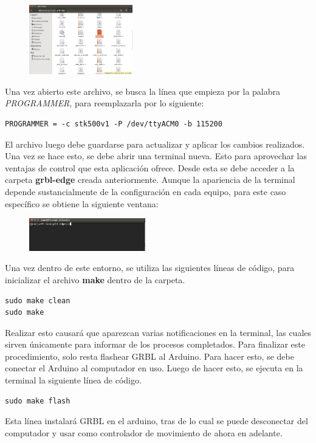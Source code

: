 \documentclass{article}
\begin{document}
\begin{multicols}{2}
\begin{enumerate}
\begin{figure}[H]
\centering
\includegraphics[width=0.4\textwidth]{Carpeta.png}
\label{fig:Carpeta}
\end{figure}

Una vez abierto este archivo, se busca la línea que empieza por la palabra \textit{PROGRAMMER}, para reemplazarla por lo siguiente:
\begin{lstlisting}
PROGRAMMER = -c stk500v1 -P /dev/ttyACM0 -b 115200 
\end{lstlisting}
El archivo luego debe guardarse para actualizar y aplicar los cambios realizados. Una vez se hace esto, se debe abrir una terminal nueva. Esto para aprovechar las ventajas de control que esta aplicación ofrece. Desde esta se debe acceder a la carpeta \textbf{grbl-edge} creada anteriormente. Aunque la apariencia de la terminal depende sustancialmente de la configuración en cada equipo, para este caso específico se obtiene la siguiente ventana:

\begin{figure}[H]
\centering
\includegraphics[width=0.45\textwidth]{Terminal.png}
\label{fig:Carpeta}
\end{figure}

Una vez dentro de este entorno, se utiliza las siguientes líneas de código, para inicializar el archivo \textbf{make} dentro de la carpeta.
\begin{lstlisting}
sudo make clean
sudo make
\end{lstlisting}
Realizar esto causará que aparezcan varias notificaciones en la terminal, las cuales sirven únicamente para informar de los procesos completados. Para finalizar este procedimiento, solo resta flashear GRBL al Arduino. Para hacer esto, se debe conectar el Arduino al computador en uso. Luego de hacer esto, se ejecuta en la terminal la siguiente línea de código.
\begin{lstlisting}
sudo make flash
\end{lstlisting}
Esta línea instalará GRBL en el arduino, tras de lo cual se puede desconectar del computador y usar como controlador de movimiento de ahora en adelante.


\end{enumerate}
\end{multicols}
\end{document}
